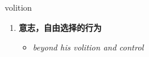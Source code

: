 
\begin{frame}
{\huge volition}
\begin{center}
\begin{enumerate}\Large
  \item \textbf{意志，自由选择的行为}
  \begin{itemize}
    \item \em{\Large{beyond his volition and control}}
  \end{itemize}
\end{enumerate}
\end{center}
\end{frame}
